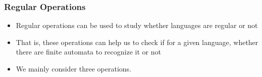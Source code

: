 



\begin{frame}[allowframebreaks] \frametitle{Regular Operations}
  \begin{itemize}
\item Regular operations can be used to study whether languages are regular or not

\item  That is, these operations can help us to check if for a given language,
  whether there are finite automata to recognize it or not
\item We mainly consider three operations.


\end{itemize}
\end{frame}
